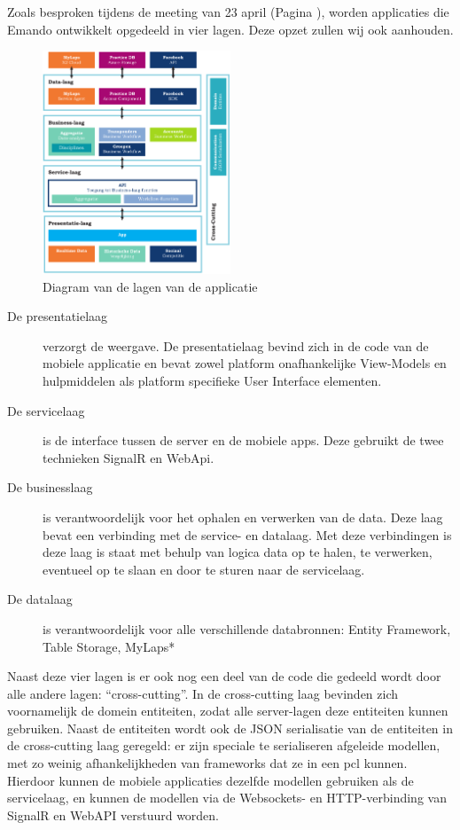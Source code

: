 Zoals besproken tijdens de meeting van 23 april (Pagina \pageref{sec:meeting-23-apr}), worden applicaties die Emando ontwikkelt opgedeeld in vier lagen. Deze opzet zullen wij ook aanhouden.

\begin{figure}[ht]
  \begin{center}
    \includegraphics[width=0.5\textwidth]{style/images/Layers}
  \end{center}
  \caption{Diagram van de lagen van de applicatie}
  \label{fig:diagram-layers}
\end{figure}

\begin{description}
\item[De presentatielaag] verzorgt de weergave. De presentatielaag bevind zich in de code van de mobiele applicatie en bevat zowel platform onafhankelijke View-Models en hulpmiddelen als platform specifieke User Interface elementen.
\item[De servicelaag] is de interface tussen de server en de mobiele apps. Deze gebruikt de twee technieken SignalR en WebApi.
\item[De businesslaag] is verantwoordelijk voor het ophalen en verwerken van de data. Deze laag bevat een verbinding met de service- en datalaag. Met deze verbindingen is deze laag is staat met behulp van logica data op te halen, te verwerken, eventueel op te slaan en door te sturen naar de servicelaag. 
\item[De datalaag] is verantwoordelijk voor alle verschillende databronnen: Entity Framework, Table Storage, MyLaps*
\end{description}

Naast deze vier lagen is er ook nog een deel van de code die gedeeld wordt door alle andere lagen: ``cross-cutting''. In de cross-cutting laag bevinden zich voornamelijk de domein entiteiten, zodat alle server-lagen deze entiteiten kunnen gebruiken. Naast de entiteiten wordt ook de JSON serialisatie van de entiteiten in de cross-cutting laag geregeld: er zijn  speciale te serialiseren afgeleide modellen, met zo weinig afhankelijkheden van frameworks dat ze in een \ac{pcl} kunnen. Hierdoor kunnen de mobiele applicaties dezelfde modellen gebruiken als de servicelaag, en kunnen de modellen via de Websockets- en HTTP-verbinding van SignalR en WebAPI verstuurd worden.

